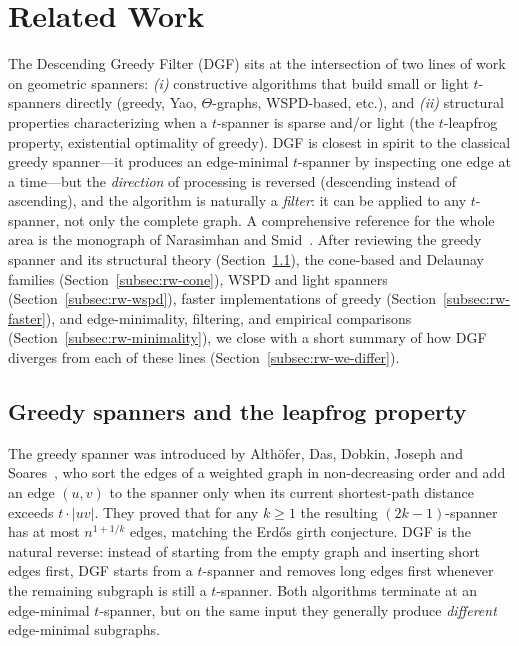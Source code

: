 \documentclass{article}
\begin{document}
\section{Related Work}
\label{sec:related-work}

The Descending Greedy Filter (DGF) sits at the intersection of two
lines of work on geometric spanners: \emph{(i)} constructive algorithms
that build small or light $t$-spanners directly (greedy, Yao,
$\Theta$-graphs, WSPD-based, etc.), and \emph{(ii)} structural properties
characterizing when a $t$-spanner is sparse and/or light (the
$t$-leapfrog property, existential optimality of greedy). DGF is
closest in spirit to the classical greedy spanner---it produces an
edge-minimal $t$-spanner by inspecting one edge at a time---but the
\emph{direction} of processing is reversed (descending instead of
ascending), and the algorithm is naturally a \emph{filter}: it can be
applied to any $t$-spanner, not only the complete graph. A
comprehensive reference for the whole area is the monograph of
Narasimhan and Smid~\cite{NS07}. After reviewing the greedy spanner
and its structural theory
(Section~\ref{subsec:rw-greedy}), the cone-based and Delaunay families
(Section~\ref{subsec:rw-cone}), WSPD and light spanners
(Section~\ref{subsec:rw-wspd}), faster implementations of greedy
(Section~\ref{subsec:rw-faster}), and edge-minimality, filtering, and
empirical comparisons (Section~\ref{subsec:rw-minimality}), we close
with a short summary of how DGF diverges from each of these lines
(Section~\ref{subsec:rw-we-differ}).

\subsection{Greedy spanners and the leapfrog property}
\label{subsec:rw-greedy}

The greedy spanner was introduced by Alth\"ofer, Das, Dobkin, Joseph
and Soares~\cite{ADDJS93}, who sort the edges of a weighted graph in
non-decreasing order and add an edge $(u,v)$ to the spanner only when
its current shortest-path distance exceeds $t\cdot|uv|$. They proved
that for any $k\ge 1$ the resulting $(2k-1)$-spanner has at most
$n^{1+1/k}$ edges, matching the Erd\H{o}s girth conjecture. DGF is the
natural reverse: instead of starting from the empty graph and inserting
short edges first, DGF starts from a $t$-spanner and removes long edges
first whenever the remaining subgraph is still a $t$-spanner. Both
algorithms terminate at an edge-minimal $t$-spanner, but on the same
input they generally produce \emph{different} edge-minimal subgraphs.
\end{document}
